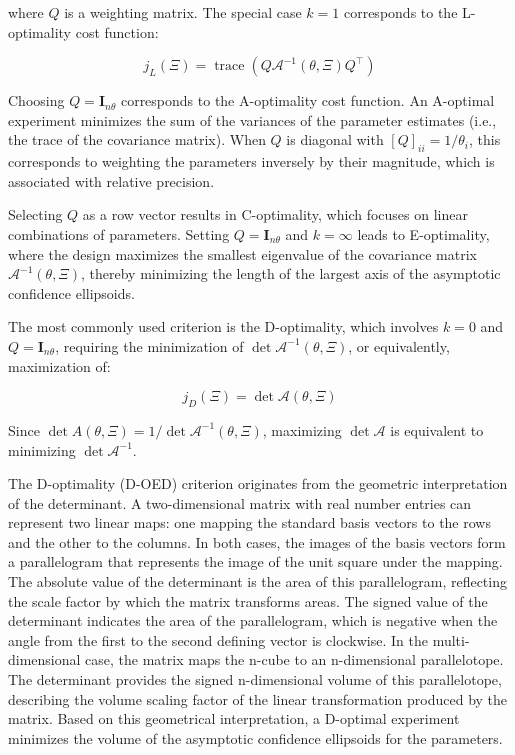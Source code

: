 \documentclass[../Article_Design_of_Experiment.tex]{subfiles}
\begin{document}
	where $Q$ is a weighting matrix. The special case $k=1$ corresponds to the L-optimality cost function:
	
	{\footnotesize \begin{equation} j_L(\Xi) = \operatorname{trace} \left( Q \mathcal{A}^{-1}(\theta, \Xi) Q^\top \right) \end{equation} }
	
	Choosing $Q = \mathbf{I}_{n\theta}$ corresponds to the A-optimality cost function. An A-optimal experiment minimizes the sum of the variances of the parameter estimates (i.e., the trace of the covariance matrix). When $Q$ is diagonal with $[Q]_{ii} = 1/\theta_i$, this corresponds to weighting the parameters inversely by their magnitude, which is associated with relative precision.
	
	Selecting $Q$ as a row vector results in C-optimality, which focuses on linear combinations of parameters. Setting $Q = \mathbf{I}_{n\theta}$ and $k = \infty$ leads to E-optimality, where the design maximizes the smallest eigenvalue of the covariance matrix $\mathcal{A}^{-1}(\theta, \Xi)$, thereby minimizing the length of the largest axis of the asymptotic confidence ellipsoids.
	
	The most commonly used criterion is the D-optimality, which involves $k = 0$ and $Q = \mathbf{I}_{n\theta}$, requiring the minimization of $\det \mathcal{A}^{-1}(\theta, \Xi)$, or equivalently, maximization of:
	
	{\footnotesize \begin{equation} j_D(\Xi) = \det \mathcal{A}(\theta, \Xi) \end{equation} }
	
	Since $\det A(\theta, \Xi) = 1 / \det \mathcal{A}^{-1}(\theta, \Xi)$, maximizing $\det \mathcal{A}$ is equivalent to minimizing $\det \mathcal{A}^{-1}$.
	
	The D-optimality (D-OED) criterion originates from the geometric interpretation of the determinant. A two-dimensional matrix with real number entries can represent two linear maps: one mapping the standard basis vectors to the rows and the other to the columns. In both cases, the images of the basis vectors form a parallelogram that represents the image of the unit square under the mapping. The absolute value of the determinant is the area of this parallelogram, reflecting the scale factor by which the matrix transforms areas. The signed value of the determinant indicates the area of the parallelogram, which is negative when the angle from the first to the second defining vector is clockwise. In the multi-dimensional case, the matrix maps the n-cube to an n-dimensional parallelotope. The determinant provides the signed n-dimensional volume of this parallelotope, describing the volume scaling factor of the linear transformation produced by the matrix. Based on this geometrical interpretation, a D-optimal experiment minimizes the volume of the asymptotic confidence ellipsoids for the parameters.
	
\end{document}
